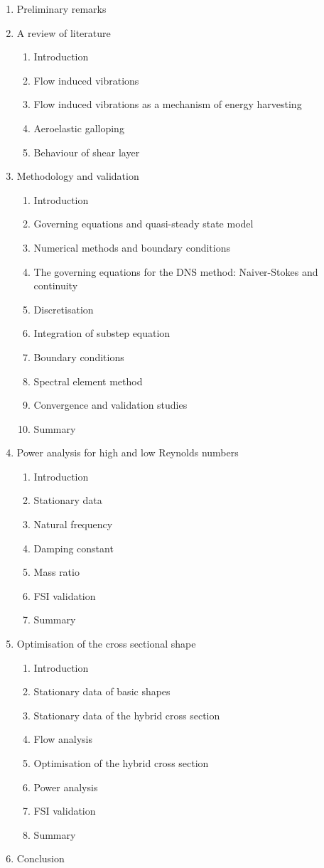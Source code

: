 \documentclass{article}
\begin{document}
\begin{enumerate}
\item Preliminary remarks 
\item A review of literature
\begin{enumerate}[i]
\item Introduction
\item Flow induced vibrations 
\item Flow induced vibrations as a mechanism of energy harvesting
\item Aeroelastic galloping
\item Behaviour of shear layer 
\end{enumerate}
\item Methodology and validation
\begin{enumerate}[i]
\item Introduction
\item Governing equations and quasi-steady state model 
\item Numerical methods and boundary conditions 
\item The governing equations for the DNS method: Naiver-Stokes and continuity  
\item Discretisation  
\item Integration of substep equation 
\item Boundary conditions 
\item Spectral element method
\item Convergence and validation studies 
\item Summary
\end{enumerate}
\item Power analysis for high and low Reynolds numbers
\begin{enumerate}[i]
\item Introduction 
\item Stationary data 
\item Natural frequency 
\item Damping constant 
\item Mass ratio
\item FSI validation 
\item Summary 
\end{enumerate}

\item Optimisation of the cross sectional shape 
\begin{enumerate}[i]
\item Introduction 
\item Stationary data of basic shapes  
\item Stationary data of the hybrid cross section
\item Flow analysis  
\item Optimisation of the hybrid cross section 
\item Power analysis 
\item FSI validation
\item Summary 
\end{enumerate}

\item Conclusion
\end{enumerate}
\end{document}
